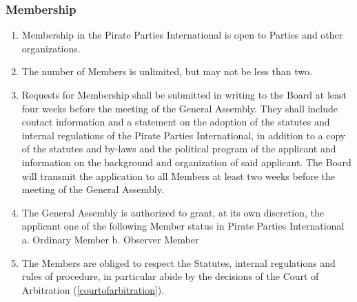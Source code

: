 \begin{frame}

\frametitle{Membership}
\label{membership}

\begin{enumerate}
\item Membership in the Pirate Parties International is open to Parties and other organizations.

\item The number of Members is unlimited, but may not be less than two.

\item Requests for Membership shall be submitted in writing to the Board at least four weeks before the meeting of the General Assembly. They shall include contact information and a statement on the adoption of the statutes and internal regulations of the Pirate Parties International, in addition to a copy of the statutes and by-{}laws and the political program of the applicant and information on the background and organization of said applicant. The Board will transmit the application to all Members at least two weeks before the meeting of the General Assembly.

\item The General Assembly is authorized to grant, at its own discretion, the applicant one of the following Member status in Pirate Parties International
 a. Ordinary Member
 b. Observer Member

\item The Members are obliged to respect the Statutes, internal regulations and rules of procedure, in particular abide by the decisions of the Court of Arbitration (\autoref{courtofarbitration}).

\end{enumerate}

\end{frame}

